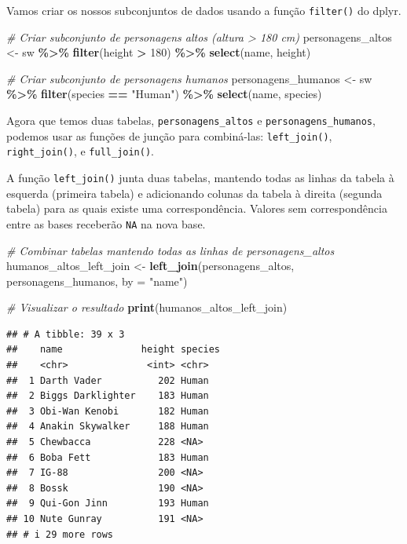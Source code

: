\documentclass[
]{book}
\newenvironment{Shaded}{\begin{snugshade}}{\end{snugshade}}
\newcommand{\AttributeTok}[1]{\textcolor[rgb]{0.13,0.29,0.53}{#1}}
\newcommand{\CommentTok}[1]{\textcolor[rgb]{0.56,0.35,0.01}{\textit{#1}}}
\newcommand{\DecValTok}[1]{\textcolor[rgb]{0.00,0.00,0.81}{#1}}
\newcommand{\FunctionTok}[1]{\textcolor[rgb]{0.13,0.29,0.53}{\textbf{#1}}}
\newcommand{\NormalTok}[1]{#1}
\newcommand{\OtherTok}[1]{\textcolor[rgb]{0.56,0.35,0.01}{#1}}
\newcommand{\SpecialCharTok}[1]{\textcolor[rgb]{0.81,0.36,0.00}{\textbf{#1}}}
\newcommand{\StringTok}[1]{\textcolor[rgb]{0.31,0.60,0.02}{#1}}
\begin{document}
Vamos criar os nossos subconjuntos de dados usando a função \texttt{filter()}
do dplyr.

\begin{Shaded}
\begin{Highlighting}[]
\CommentTok{\# Criar subconjunto de personagens altos (altura \textgreater{} 180 cm)}
\NormalTok{personagens\_altos }\OtherTok{\textless{}{-}}\NormalTok{ sw }\SpecialCharTok{\%\textgreater{}\%}
  \FunctionTok{filter}\NormalTok{(height }\SpecialCharTok{\textgreater{}} \DecValTok{180}\NormalTok{) }\SpecialCharTok{\%\textgreater{}\%}
  \FunctionTok{select}\NormalTok{(name, height)}

\CommentTok{\# Criar subconjunto de personagens humanos}
\NormalTok{personagens\_humanos }\OtherTok{\textless{}{-}}\NormalTok{ sw }\SpecialCharTok{\%\textgreater{}\%}
  \FunctionTok{filter}\NormalTok{(species }\SpecialCharTok{==} \StringTok{"Human"}\NormalTok{) }\SpecialCharTok{\%\textgreater{}\%}
  \FunctionTok{select}\NormalTok{(name, species)}
\end{Highlighting}
\end{Shaded}

Agora que temos duas tabelas, \texttt{personagens\_altos} e
\texttt{personagens\_humanos}, podemos usar as funções de junção para
combiná-las: \texttt{left\_join()}, \texttt{right\_join()}, e \texttt{full\_join()}.

A função \texttt{left\_join()} junta duas tabelas, mantendo todas as linhas da
tabela à esquerda (primeira tabela) e adicionando colunas da tabela à
direita (segunda tabela) para as quais existe uma correspondência.
Valores sem correspondência entre as bases receberão \texttt{NA} na nova base.

\begin{Shaded}
\begin{Highlighting}[]
\CommentTok{\# Combinar tabelas mantendo todas as linhas de personagens\_altos}
\NormalTok{humanos\_altos\_left\_join }\OtherTok{\textless{}{-}} \FunctionTok{left\_join}\NormalTok{(personagens\_altos, personagens\_humanos, }\AttributeTok{by =} \StringTok{"name"}\NormalTok{)}

\CommentTok{\# Visualizar o resultado}
\FunctionTok{print}\NormalTok{(humanos\_altos\_left\_join)}
\end{Highlighting}
\end{Shaded}

\begin{verbatim}
## # A tibble: 39 x 3
##    name              height species
##    <chr>              <int> <chr>  
##  1 Darth Vader          202 Human  
##  2 Biggs Darklighter    183 Human  
##  3 Obi-Wan Kenobi       182 Human  
##  4 Anakin Skywalker     188 Human  
##  5 Chewbacca            228 <NA>   
##  6 Boba Fett            183 Human  
##  7 IG-88                200 <NA>   
##  8 Bossk                190 <NA>   
##  9 Qui-Gon Jinn         193 Human  
## 10 Nute Gunray          191 <NA>   
## # i 29 more rows
\end{verbatim}
\end{document}
